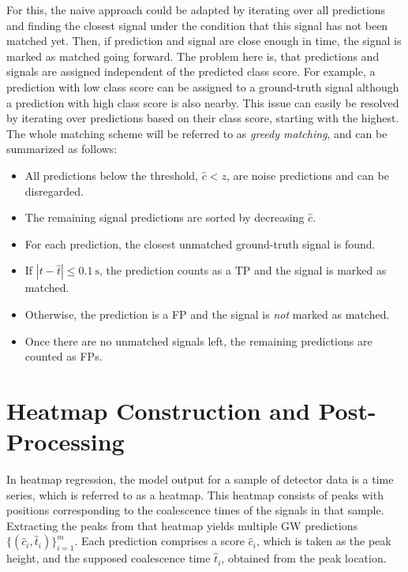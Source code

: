 For this, the naive approach could be adapted by iterating over all predictions and finding the closest signal under the condition that this signal has not been matched yet. Then, if prediction and signal are close enough in time, the signal is marked as matched going forward. The problem here is, that predictions and signals are assigned independent of the predicted class score. For example, a prediction with low class score can be assigned to a ground-truth signal although a prediction with high class score is also nearby. This issue can easily be resolved by iterating over predictions based on their class score, starting with the highest. The whole matching scheme will be referred to as \emph{greedy matching}, and can be summarized as follows:
\begin{itemize}[noitemsep]
	\item All predictions below the threshold, $\hat{c}<z$, are noise predictions and can be disregarded.
	\item The remaining signal predictions are sorted by decreasing $\hat{c}$.
	\item For each prediction, the closest unmatched ground-truth signal is found.
	\item If $|t-\hat{t}|\leq\SI{0.1}{\second}$, the prediction counts as a TP and the signal is marked as matched.
	\item Otherwise, the prediction is a FP and the signal is \emph{not} marked as matched.
	\item Once there are no unmatched signals left, the remaining predictions are counted as FPs.
\end{itemize}

\section{Heatmap Construction and Post-Processing}


In heatmap regression, the model output for a sample of detector data is a time series, which is referred to as a heatmap. This heatmap consists of peaks with positions corresponding to the coalescence times of the signals in that sample. Extracting the peaks from that heatmap yields multiple GW predictions $\{(\hat{c}_i,\hat{t}_i)\}_{i=1}^{m}$. Each prediction comprises a score $\hat{c}_i$, which is taken as the peak height, and the supposed coalescence time $\hat{t}_i$, obtained from the peak location.

